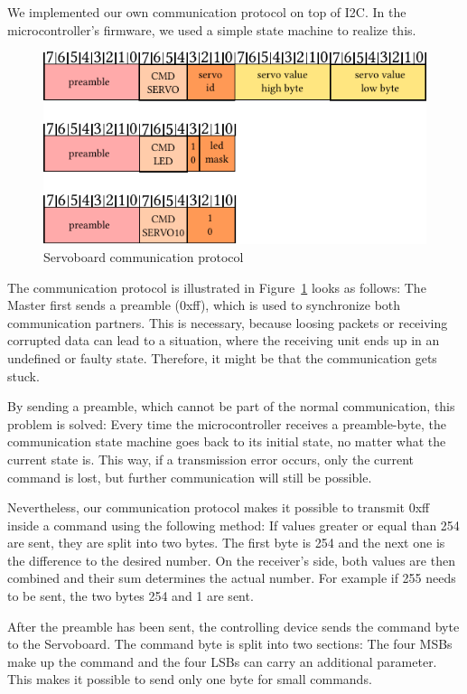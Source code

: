 \documentclass[a4paper
               ,10pt
               ,DIV=10 %
               ,BCOR=0.3cm
               ,pagesize %
               ,headings=small
               ,bibtotoc
               ]
               {scrartcl}
\begin{document}
We implemented our own communication protocol on top of I2C.
In the microcontroller's firmware, we used a simple state machine to realize this.

\begin{figure}[H]
\begin{center}
\includegraphics[width=\linewidth]{pic/servoboardcmds}
\caption{Servoboard communication protocol}
\label{figservoboardcmds}
\end{center}
\end{figure}

The communication protocol is illustrated in Figure~\ref{figservoboardcmds} looks as follows:
The Master first sends a preamble (0xff), which is used to synchronize both communication partners.
This is necessary, because loosing packets or receiving corrupted data can lead to a situation, where the receiving unit ends up in an undefined or faulty state.
Therefore, it might be that the communication gets stuck.

By sending a preamble, which cannot be part of the normal communication, this problem is solved: Every time the microcontroller receives a preamble-byte, the communication state machine goes back to its initial state, no matter what the current state is.
This way, if a transmission error occurs, only the current command is lost, but further communication will still be possible.


Nevertheless, our communication protocol makes it possible to transmit 0xff inside a command using the following method:
If values greater or equal than 254 are sent, they are split into two bytes.
The first byte is 254 and the next one is the difference to the desired number.
On the receiver's side, both values are then combined and their sum determines the actual number. 
For example if 255 needs to be sent, the two bytes 254 and 1 are sent.


After the preamble has been sent, the controlling device sends the command byte to the Servoboard.
The command byte is split into two sections:
The four MSBs make up the command and the four LSBs can carry an additional parameter.
This makes it possible to send only one byte for small commands.
\end{document}

